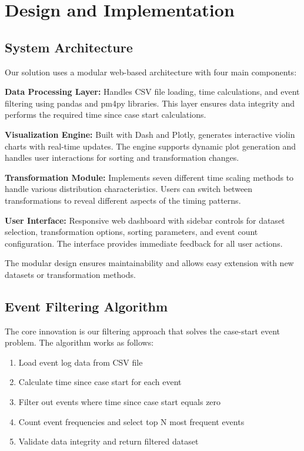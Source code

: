 
\section{Design and Implementation}
\label{sec:design}

\subsection{System Architecture}
\label{subsec:architecture}

Our solution uses a modular web-based architecture with four main components:

\textbf{Data Processing Layer:} Handles CSV file loading, time calculations, and event filtering using pandas and pm4py libraries. This layer ensures data integrity and performs the required time since case start calculations.

\textbf{Visualization Engine:} Built with Dash and Plotly, generates interactive violin charts with real-time updates. The engine supports dynamic plot generation and handles user interactions for sorting and transformation changes.

\textbf{Transformation Module:} Implements seven different time scaling methods to handle various distribution characteristics. Users can switch between transformations to reveal different aspects of the timing patterns.

\textbf{User Interface:} Responsive web dashboard with sidebar controls for dataset selection, transformation options, sorting parameters, and event count configuration. The interface provides immediate feedback for all user actions.

The modular design ensures maintainability and allows easy extension with new datasets or transformation methods.

\subsection{Event Filtering Algorithm}
\label{subsec:filtering}

The core innovation is our filtering approach that solves the case-start event problem. The algorithm works as follows:

\begin{enumerate}
    \item Load event log data from CSV file
    \item Calculate time since case start for each event
    \item Filter out events where time since case start equals zero
    \item Count event frequencies and select top N most frequent events
    \item Validate data integrity and return filtered dataset
\end{enumerate}

